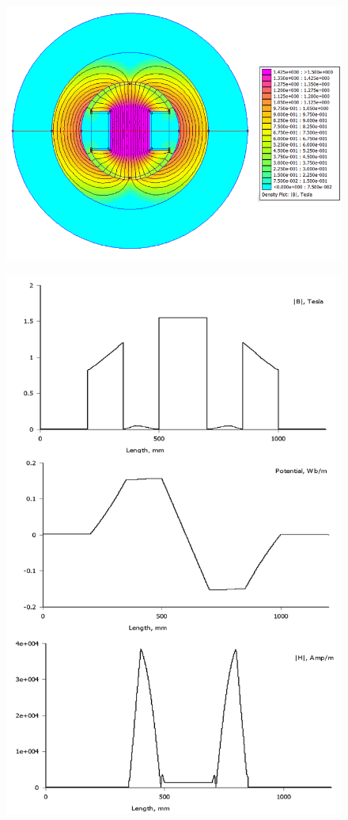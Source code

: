 \begin{figure}[H]
\centering
\includegraphics[scale=0.4]{img/assig4/femm_f.png}
\caption[]{}
\label{}
\end{figure}

\begin{figure}[H]
\centering
\includegraphics[scale=0.4]{img/assig4/femm_grafs.png}
\caption[]{}
\label{}
\end{figure}
